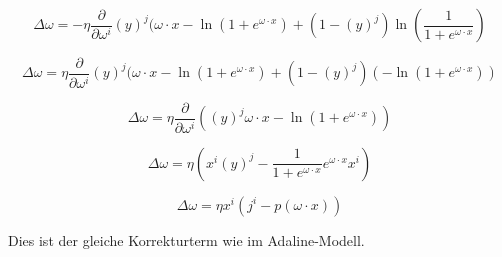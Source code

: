 \documentclass[11pt]{article} %
\begin{document}
\begin{equation}
\Delta \omega =-\eta \frac{\partial}{\partial \omega^i}  (y)^j (\omega \cdot x - \ln(1+e^{\omega \cdot x}) + (1-(y)^j) \ln( \frac{1}{1+e^{\omega \cdot x}})
\end{equation}


\begin{equation}
\Delta \omega = \eta \frac{\partial}{\partial \omega^i}  (y)^j (\omega \cdot x - \ln(1+e^{\omega \cdot x}) + (1-(y)^j) (-\ln(1+e^{\omega \cdot x}))
\end{equation}


\begin{equation}
\Delta \omega = \eta \frac{\partial}{\partial \omega^i}  ((y)^j \omega \cdot x - \ln(1+e^{\omega \cdot x}))
\end{equation}


\begin{equation}
\Delta \omega = \eta  ( x^{i}(y)^j  - \frac{1}{1+e^{\omega \cdot x}} e^{\omega \cdot x} x^{i})
\end{equation}

\begin{equation}
\Delta \omega = \eta  x^{i} ( j^{i}- p(\omega \cdot x))
\end{equation}

Dies ist der gleiche Korrekturterm wie im Adaline-Modell.
\end{document}
